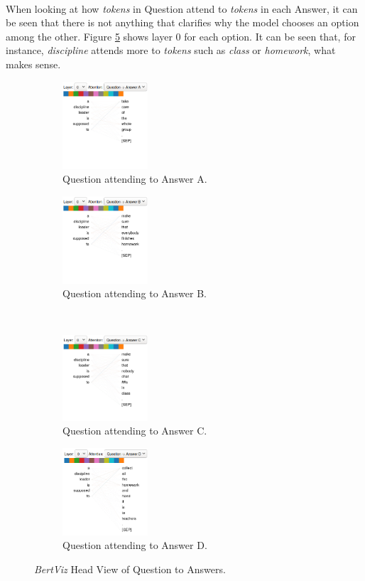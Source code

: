 \paragraph{}
When looking at how \emph{tokens} in Question attend to \emph{tokens} in each Answer, it can be seen that there is not anything that clarifies why the model chooses an option among the other. Figure \ref{fig:bertviz-q-options} shows layer 0 for each option. It can be seen that, for instance, \emph{discipline} attends more to \emph{tokens} such as \emph{class} or \emph{homework}, what makes sense. 
\begin{figure}[h]
\centering
\begin{subfigure}{0.4\textwidth}
  \centering
	\includegraphics[width=120px]{images/bertviz-question-a}
	\caption{Question attending to Answer A.}
	\label{fig:bertviz-q-aa}
\end{subfigure}
\medskip
\begin{subfigure}{0.4\textwidth}
  \centering
	\includegraphics[width=120px]{images/bertviz-question-b}
	\caption{Question attending to Answer B.}
	\label{fig:bertviz-q-ab}
\end{subfigure}
\medskip\\
\begin{subfigure}{0.4\textwidth}
  \centering
	\includegraphics[width=120px]{images/bertviz-question-c}
	\caption{Question attending to Answer C.}
	\label{fig:bertviz-q-ac}
\end{subfigure}
\medskip
\begin{subfigure}{0.4\textwidth}
  \centering
	\includegraphics[width=120px]{images/bertviz-question-d}
	\caption{Question attending to Answer D.}
	\label{fig:bertviz-q-ad}
\end{subfigure}
\caption{\emph{BertViz} Head View of Question to Answers.}
\label{fig:bertviz-q-options}
\end{figure}
